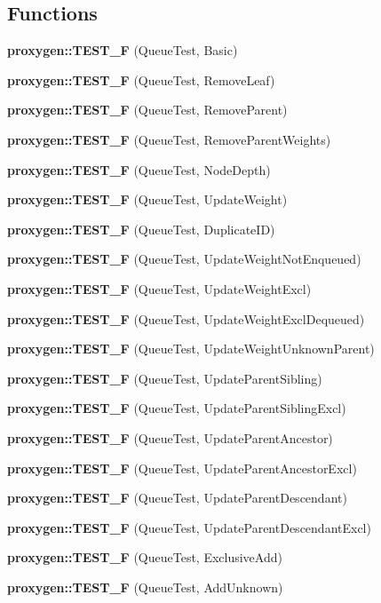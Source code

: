 \subsection*{Functions}
\begin{DoxyCompactItemize}
\item 
{\bf proxygen\+::\+T\+E\+S\+T\+\_\+F} (Queue\+Test, Basic)
\item 
{\bf proxygen\+::\+T\+E\+S\+T\+\_\+F} (Queue\+Test, Remove\+Leaf)
\item 
{\bf proxygen\+::\+T\+E\+S\+T\+\_\+F} (Queue\+Test, Remove\+Parent)
\item 
{\bf proxygen\+::\+T\+E\+S\+T\+\_\+F} (Queue\+Test, Remove\+Parent\+Weights)
\item 
{\bf proxygen\+::\+T\+E\+S\+T\+\_\+F} (Queue\+Test, Node\+Depth)
\item 
{\bf proxygen\+::\+T\+E\+S\+T\+\_\+F} (Queue\+Test, Update\+Weight)
\item 
{\bf proxygen\+::\+T\+E\+S\+T\+\_\+F} (Queue\+Test, Duplicate\+ID)
\item 
{\bf proxygen\+::\+T\+E\+S\+T\+\_\+F} (Queue\+Test, Update\+Weight\+Not\+Enqueued)
\item 
{\bf proxygen\+::\+T\+E\+S\+T\+\_\+F} (Queue\+Test, Update\+Weight\+Excl)
\item 
{\bf proxygen\+::\+T\+E\+S\+T\+\_\+F} (Queue\+Test, Update\+Weight\+Excl\+Dequeued)
\item 
{\bf proxygen\+::\+T\+E\+S\+T\+\_\+F} (Queue\+Test, Update\+Weight\+Unknown\+Parent)
\item 
{\bf proxygen\+::\+T\+E\+S\+T\+\_\+F} (Queue\+Test, Update\+Parent\+Sibling)
\item 
{\bf proxygen\+::\+T\+E\+S\+T\+\_\+F} (Queue\+Test, Update\+Parent\+Sibling\+Excl)
\item 
{\bf proxygen\+::\+T\+E\+S\+T\+\_\+F} (Queue\+Test, Update\+Parent\+Ancestor)
\item 
{\bf proxygen\+::\+T\+E\+S\+T\+\_\+F} (Queue\+Test, Update\+Parent\+Ancestor\+Excl)
\item 
{\bf proxygen\+::\+T\+E\+S\+T\+\_\+F} (Queue\+Test, Update\+Parent\+Descendant)
\item 
{\bf proxygen\+::\+T\+E\+S\+T\+\_\+F} (Queue\+Test, Update\+Parent\+Descendant\+Excl)
\item 
{\bf proxygen\+::\+T\+E\+S\+T\+\_\+F} (Queue\+Test, Exclusive\+Add)
\item 
{\bf proxygen\+::\+T\+E\+S\+T\+\_\+F} (Queue\+Test, Add\+Unknown)
\item 

\end{DoxyCompactItemize}
